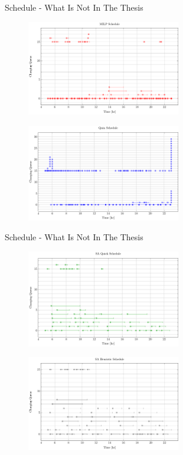 \documentclass[bigger]{beamer}
\begin{document}
\begin{frame}[label={sec:org4e28fa8}]{Schedule - What Is Not In The Thesis}
\begin{figure}[htpb]
\centering
    \includegraphics[width=0.6\textwidth]{img/sa-pap-paper-good/schedule-milp}
\end{figure}
\begin{figure}[htpb]
\centering
    \includegraphics[width=0.6\textwidth]{img/sa-pap-paper-good/schedule-quinn}
\end{figure}
\end{frame}

\begin{frame}[label={sec:orgc227f3b}]{Schedule - What Is Not In The Thesis}
\begin{figure}[htpb]
\centering
    \includegraphics[width=0.6\textwidth]{img/sa-pap-paper-good/schedule-sa-quick}
\end{figure}
\begin{figure}[htpb]
\centering
    \includegraphics[width=0.6\textwidth]{img/sa-pap-paper-good/schedule-sa-heuristic}
\end{figure}
\end{frame}
\end{document}
